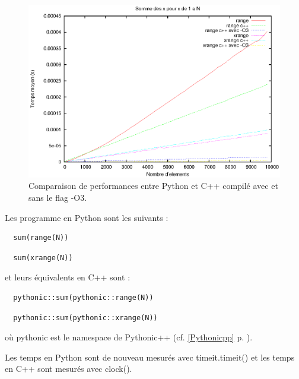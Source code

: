 \documentclass[a4paper]{article}
\begin{document}
\begin{figure}[h]
  \includegraphics[scale=1]{./Pictures/RangeXrangePyCpp}
  \caption{Comparaison de performances entre Python et C++ compilé avec et sans le flag -O3.}
  \label{RangeXrangePyCpp}
\end{figure}

Les programme en Python sont les suivants :

\begin{verbatim}
  sum(range(N))
\end{verbatim}

\begin{verbatim}
  sum(xrange(N))
\end{verbatim}

et leurs équivalents en C++ sont :

\begin{verbatim}
  pythonic::sum(pythonic::range(N))
\end{verbatim}

\begin{verbatim}
  pythonic::sum(pythonic::xrange(N))
\end{verbatim}

où pythonic est le namespace de Pythonic++ (cf. \ref{Pythonicpp}
p. \pageref{Pythonicpp}).

Les temps en Python sont de nouveau mesurés avec timeit.timeit() et
les temps en C++ sont mesurés avec clock().
\end{document}
